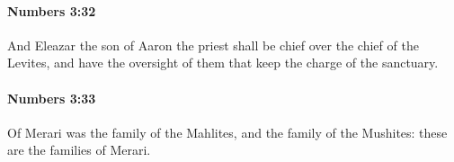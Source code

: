 		\paragraph{Numbers 3:32} %
			\label{NUMBERS-3-32}

			And Eleazar the son of Aaron the priest shall be chief over the chief of the Levites, and have the oversight of them that keep the charge of the sanctuary.


		\paragraph{Numbers 3:33} %
			\label{NUMBERS-3-33}

			Of Merari was the family of the Mahlites, and the family of the Mushites: these are the families of Merari.


